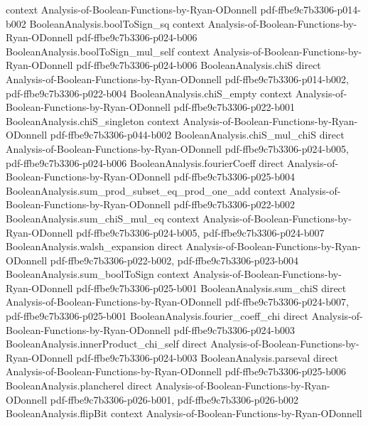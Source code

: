 \begin{theorem}
  {context}
  {Analysis-of-Boolean-Functions-by-Ryan-ODonnell}
  {pdf-ffbe9c7b3306-p014-b002}
\proofstep
  {BooleanAnalysis.boolToSign_sq}
  {context}
  {Analysis-of-Boolean-Functions-by-Ryan-ODonnell}
  {pdf-ffbe9c7b3306-p024-b006}
\proofstep
  {BooleanAnalysis.boolToSign_mul_self}
  {context}
  {Analysis-of-Boolean-Functions-by-Ryan-ODonnell}
  {pdf-ffbe9c7b3306-p024-b006}
\proofstep
  {BooleanAnalysis.chiS}
  {direct}
  {Analysis-of-Boolean-Functions-by-Ryan-ODonnell}
  {pdf-ffbe9c7b3306-p014-b002,
    pdf-ffbe9c7b3306-p022-b004}
\proofstep
  {BooleanAnalysis.chiS_empty}
  {context}
  {Analysis-of-Boolean-Functions-by-Ryan-ODonnell}
  {pdf-ffbe9c7b3306-p022-b001}
\proofstep
  {BooleanAnalysis.chiS_singleton}
  {context}
  {Analysis-of-Boolean-Functions-by-Ryan-ODonnell}
  {pdf-ffbe9c7b3306-p044-b002}
\proofstep
  {BooleanAnalysis.chiS_mul_chiS}
  {direct}
  {Analysis-of-Boolean-Functions-by-Ryan-ODonnell}
  {pdf-ffbe9c7b3306-p024-b005,
    pdf-ffbe9c7b3306-p024-b006}
\proofstep
  {BooleanAnalysis.fourierCoeff}
  {direct}
  {Analysis-of-Boolean-Functions-by-Ryan-ODonnell}
  {pdf-ffbe9c7b3306-p025-b004}
\proofstep
  {BooleanAnalysis.sum_prod_subset_eq_prod_one_add}
  {context}
  {Analysis-of-Boolean-Functions-by-Ryan-ODonnell}
  {pdf-ffbe9c7b3306-p022-b002}
\proofstep
  {BooleanAnalysis.sum_chiS_mul_eq}
  {context}
  {Analysis-of-Boolean-Functions-by-Ryan-ODonnell}
  {pdf-ffbe9c7b3306-p024-b005,
    pdf-ffbe9c7b3306-p024-b007}
\proofstep
  {BooleanAnalysis.walsh_expansion}
  {direct}
  {Analysis-of-Boolean-Functions-by-Ryan-ODonnell}
  {pdf-ffbe9c7b3306-p022-b002,
    pdf-ffbe9c7b3306-p023-b004}
\proofstep
  {BooleanAnalysis.sum_boolToSign}
  {context}
  {Analysis-of-Boolean-Functions-by-Ryan-ODonnell}
  {pdf-ffbe9c7b3306-p025-b001}
\proofstep
  {BooleanAnalysis.sum_chiS}
  {direct}
  {Analysis-of-Boolean-Functions-by-Ryan-ODonnell}
  {pdf-ffbe9c7b3306-p024-b007,
    pdf-ffbe9c7b3306-p025-b001}
\proofstep
  {BooleanAnalysis.fourier_coeff_chi}
  {direct}
  {Analysis-of-Boolean-Functions-by-Ryan-ODonnell}
  {pdf-ffbe9c7b3306-p024-b003}
\proofstep
  {BooleanAnalysis.innerProduct_chi_self}
  {direct}
  {Analysis-of-Boolean-Functions-by-Ryan-ODonnell}
  {pdf-ffbe9c7b3306-p024-b003}
\proofstep
  {BooleanAnalysis.parseval}
  {direct}
  {Analysis-of-Boolean-Functions-by-Ryan-ODonnell}
  {pdf-ffbe9c7b3306-p025-b006}
\proofstep
  {BooleanAnalysis.plancherel}
  {direct}
  {Analysis-of-Boolean-Functions-by-Ryan-ODonnell}
  {pdf-ffbe9c7b3306-p026-b001,
    pdf-ffbe9c7b3306-p026-b002}
\proofstep
  {BooleanAnalysis.flipBit}
  {context}
  {Analysis-of-Boolean-Functions-by-Ryan-ODonnell}

\end{theorem}

